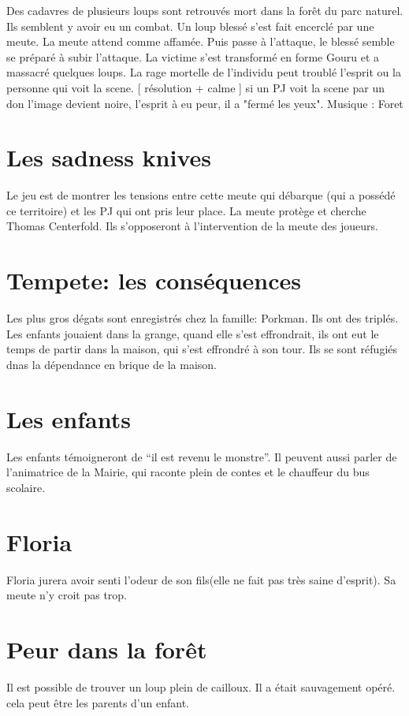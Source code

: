 \documentclass[oneside,12pt]{book}
\begin{document}
\begin{flushleft}
 
Des cadavres de plusieurs loups sont retrouvés mort dans la forêt du parc naturel. 
Ils semblent y avoir eu un combat. Un loup blessé s'est fait encerclé par une meute. La meute attend comme affamée. 
Puis passe à l'attaque, le blessé semble se préparé à subir l'attaque. La victime s'est transformé en forme Gouru et a massacré quelques loups.
La rage mortelle de l'individu peut troublé l'esprit ou la personne qui voit la scene. [ résolution + calme ] si un PJ voit la scene par un don l'image devient noire, l'esprit à eu peur, il a "fermé les yeux". 
Musique : Foret 

\section{Les sadness knives}
Le jeu est de montrer les tensions entre cette meute qui débarque (qui a possédé ce territoire) et les PJ qui ont pris leur place.
La meute protège et cherche Thomas Centerfold. Ils s'opposeront à l'intervention de la meute des joueurs.


\section{Tempete: les conséquences}
Les plus gros dégats sont enregistrés chez la famille: Porkman. Ils ont des triplés. Les enfants jouaient dans la grange, quand elle s'est effrondrait, 
ils ont eut le temps de partir dans la maison, qui s'est effrondré à son tour. Ils se sont réfugiés dnas la dépendance en brique de la maison.

\section{Les enfants}
 Les enfants témoigneront de “il est revenu le monstre”. Il peuvent aussi parler de l’animatrice de la Mairie, qui raconte plein de contes et le chauffeur du bus scolaire.

\section{Floria}
Floria jurera avoir senti l’odeur de son fils(elle ne fait pas très saine d’esprit). Sa meute n’y croit pas trop.

\section{Peur dans la forêt}
Il est possible de trouver un loup plein de cailloux. Il a était sauvagement opéré. cela peut être les parents d'un enfant. 


\end{flushleft}
\end{document}
